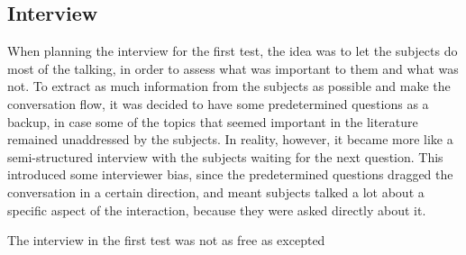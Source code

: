 \subsection{Interview}
When planning the interview for the first test, the idea was to let the subjects do most of the talking, in order to assess what was important to them and what was not. To extract as much information from the subjects as possible and make the conversation flow, it was decided to have some predetermined questions as a backup, in case some of the topics that seemed important in the literature remained unaddressed by the subjects. In reality, however, it became more like a semi-structured interview with the subjects waiting for the next question. This introduced some interviewer bias, since the predetermined questions dragged the conversation in a certain direction, and meant subjects talked a lot about a specific aspect of the interaction, because they were asked directly about it.


The interview in the first test was not as free as excepted 